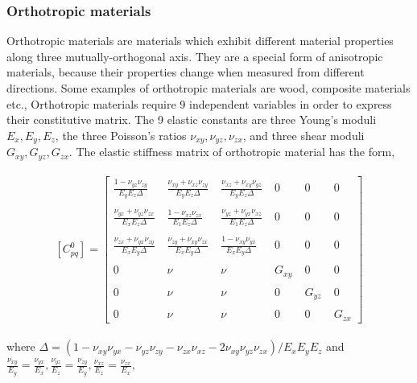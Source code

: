 \documentclass[a4paper,14pt]{extarticle}
\begin{document}
\subsubsection{Orthotropic materials}
\indent\indent\indent Orthotropic materials are materials which exhibit different material properties along three mutually-orthogonal axis. They are a special form of anisotropic materials, because their properties change when measured from different directions. Some examples of orthotropic materials are wood, composite materials etc., Orthotropic materials require 9 independent variables in order to express their constitutive matrix. The 9 elastic constants are three Young's moduli $E_{x},E_{y},E_{z}$, the three Poisson's ratios $\nu_{xy},\nu_{yz},\nu_{zx}$, and three shear moduli $G_{xy},G_{yz},G_{zx}$. The elastic stiffness matrix of orthotropic material has the form,
\\
\\
$$
[C^{0}_{pq}] =  
 \begin{bmatrix}
  \frac{1 - \nu_{yz}\nu_{zy}}{E_{y}E_{z}\Delta} \;& \frac{\nu_{xy} + \nu_{xz}\nu_{zy}}{E_{y}E_{z}\Delta}  \;& \frac{\nu_{xz} + \nu_{xy}\nu_{yz}}{E_{y}E_{z}\Delta}  \;& 0 \;& 0 \;& 0 \\
 \\
   \frac{\nu_{yx} + \nu_{yz}\nu_{zx}}{E_{x}E_{z}\Delta}  \;&  \frac{1 - \nu_{xz}\nu_{zx}}{E_{1}E_{z}\Delta} \; & \frac{\nu_{yz} +\nu_{yx}\nu_{xz}}{E_{1}E_{z}\Delta}  \; & 0\; & 0\; & 0 \\
  \\
    \frac{\nu_{zx} + \nu_{yx}\nu_{zy}}{E_{x}E_{y}\Delta}  \;&   \frac{\nu_{zy} + \nu_{xy}\nu_{zx}}{E_{x}E_{y}\Delta} \;& \frac{1 - \nu_{xy}\nu_{yx}}{E_{x}E_{y}\Delta}  \;& 0 \;& 0 \;& 0 \\ 
\\

 
  0 \;& \nu \;& \nu \;& G_{xy} \;& 0 \;& 0 \\
  \\
  0 \;& \nu \;& \nu \;& 0 \;& G_{yz} \;& 0 \\
  \\
  0\;& \nu \;& \nu \;& 0 \;& 0 \;& G_{zx} 
 \end{bmatrix}
 $$\\
 
 where $\Delta = (1 - \nu_{xy}\nu_{yx} - \nu_{yz}\nu_{zy} - \nu_{zx}\nu_{xz} - 2\nu_{xy}\nu_{yz}\nu_{zx})/E_{x}E_{y}E_{z}$ and 
  $ \frac{\nu_{xy}}{E_{y}} = \frac{\nu_{yx}}{E_{x}}, \frac{\nu_{yz}}{E_{z}} = \frac{\nu_{zy}}{E_{y}}, \frac{\nu_{xz}}{E_{z}} = \frac{\nu_{zx}}{E_{x}},  $
\end{document}
